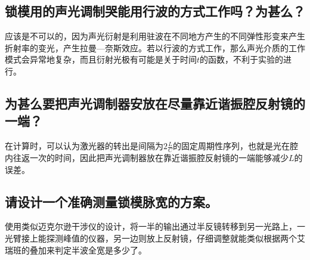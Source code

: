 \documentclass[font=default]{mpltx}
\begin{document}
\subsection{锁模用的声光调制哭能用行波的方式工作吗？为甚么？}
应该是不可以的，因为声光衍射是利用驻波在不同地方产生的不同弹性形变来产生折射率的变光，产生拉曼—奈斯效应。若以行波的方式工作，那么声光介质的工作模式会异常地复杂，而且衍射光极有可能是关于时间$t$的函数，不利于实验的进行。
\subsection{为甚么要把声光调制器安放在尽量靠近谐振腔反射镜的一端？}
在计算时，可以认为激光器的转出是间隔为$2\frac{L}{C}$的固定周期性序列，也就是光在腔内往返一次的时间，因此把声光调制器放在靠近谐振腔反射镜的一端能够减少$L$的误差。
\subsection{请设计一个准确测量锁模脉宽的方案。}
使用类似迈克尔逊干涉仪的设计，将一半的输出通过半反镜转移到另一光路上，一光臂接上能探测峰值的仪器，另一边则放上反射镜，仔细调整就能类似根据两个艾瑞班的叠加来判定半波全宽是多少了。
\end{document}
